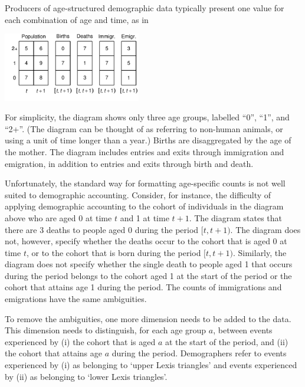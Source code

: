 \documentclass[USenglish]{article}
\begin{document}
Producers of age-structured demographic data typically present one value for each combination of age and time, as in
\begin{center}
\includegraphics[width=0.45\textwidth]{figures_accounts/fig_account_withage_nolex}
\end{center}
For simplicity, the diagram shows only three age groups, labelled ``0'', ``1'', and ``2+''. (The diagram can be thought of as referring to non-human animals, or using a unit of time longer than a year.) Births are disaggregated by the age of the mother. The diagram includes entries and exits through immigration and emigration, in addition to entries and exits through birth and death.

Unfortunately, the standard way for formatting age-specific counts is not well suited to demographic accounting. Consider, for instance, the difficulty of applying demographic accounting to the cohort of individuals in the diagram above who are aged 0 at time $t$ and 1 at time $t+1$. The diagram states that there are 3 deaths to people aged 0 during the period $[t,t+1)$. The diagram does not, however, specify whether the deaths occur to the cohort that is aged 0 at time $t$, or to the cohort that is born during the period  $[t,t+1)$. Similarly, the diagram does not specify whether the single death to people aged 1 that occurs during the period belongs to the cohort aged 1 at the start of the period or the cohort that attains age 1 during the period. The counts of immigrations and emigrations have the same ambiguities. 

To remove the ambiguities, one more dimension needs to be added to the data.  This dimension needs to distinguish, for each age group $a$, between events experienced by (i) the cohort that is aged $a$ at the start of the period, and (ii) the cohort that attains age $a$ during the period. Demographers refer to events experienced by (i) as belonging to `upper Lexis triangles' and events experienced by (ii) as belonging to `lower Lexis triangles'.
\end{document}
